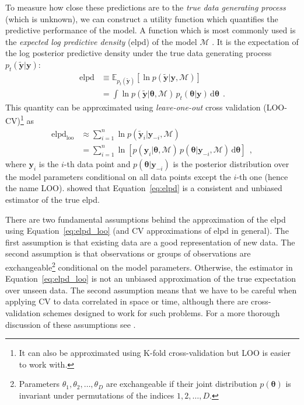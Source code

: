 \documentclass[12pt,dvipsnames]{report}
\newcommand{\ud}{\,\mathrm{d}}
\renewcommand{\vec}[1]{\boldsymbol{\mathbf{#1}}}
\newcommand{\hquad}{~~}
\begin{document}
To measure how close these predictions are to the \emph{true data generating process} 
(which is unknown), we can construct a utility function which quantifies the 
predictive performance of the model.  A function which is most commonly used is the 
\emph{expected log predictive density} (elpd) of the model $\mathcal{M}$
\citep[see][for a discussion of list of other common choices]{arXiv:1912.11218v2}.
It is the expectation of the log posterior predictive density under the true data 
generating process $p_t(\tilde{\vec y}|\vec y)$:
\begin{align}
    \mathrm{elpd}&\equiv\mathbb{E}_{p_t(\tilde{\vec y})}\left[ \ln p(\tilde{\vec y}|\vec y,\mathcal{M})\right]\\
    &= \int \ln p(\tilde{\vec y}|\vec \theta,\mathcal{M})\,p_t(\vec \theta|\vec y)\ud\vec \theta
    \hquad.
    \label{eq:elpd}
\end{align}
This quantity can be approximated using \emph{leave-one-out} cross validation (LOO-CV)\footnote{
    It can also be approximated using K-fold cross-validation but LOO is easier to work with.
}
as \citep{vehtari2017}
\begin{align}
\mathrm{elpd}_\mathrm{loo}&\approx \sum_{i=1}^n \ln p(\tilde{\vec y}_i|\vec y_{-i},\mathcal{M})\\
&=\sum_{i=1}^n\ln\left[p(\vec y_i|\vec \theta,\mathcal{M})\,p(\vec \theta | \vec y_{-i},\mathcal{M})\ud\vec\theta\right]
\hquad,
\label{eq:elpd_loo}
\end{align}
where $\vec y_i$ is the $i$-th data point and $p(\vec \theta|\vec y_{-i})$ is the 
posterior distribution over the model parameters conditional on all data points except 
the $i$-th one (hence the name LOO). 
\citet{arXiv:1004.2316} showed that Equation~\ref{eq:elpd} is a consistent and unbiased 
estimator of the true elpd.

There are two fundamental assumptions behind the approximation of the elpd using 
Equation~\ref{eq:elpd_loo} (and CV approximations of elpd in general).
The first assumption is that existing data are a good representation
of new data. The second assumption is that observations or groups of observations are 
exchangeable\footnote{Parameters $\theta_1,\theta_2,\ldots,\theta_D$ are
exchangeable if their joint distribution $p(\vec \theta)$ is invariant under permutations
of the indices $1,2,\ldots,D$.} conditional on the model parameters. Otherwise, the 
estimator in Equation~\ref{eq:elpd_loo} is not an unbiased approximation of the true 
expectation over unseen data. The second assumption means that we have to be careful when 
applying CV to data correlated in space or time, although there are cross-validation
schemes designed to work for such problems. For a more thorough discussion of these 
assumptions see \citet{arXiv:1810.05374}.
\end{document}
